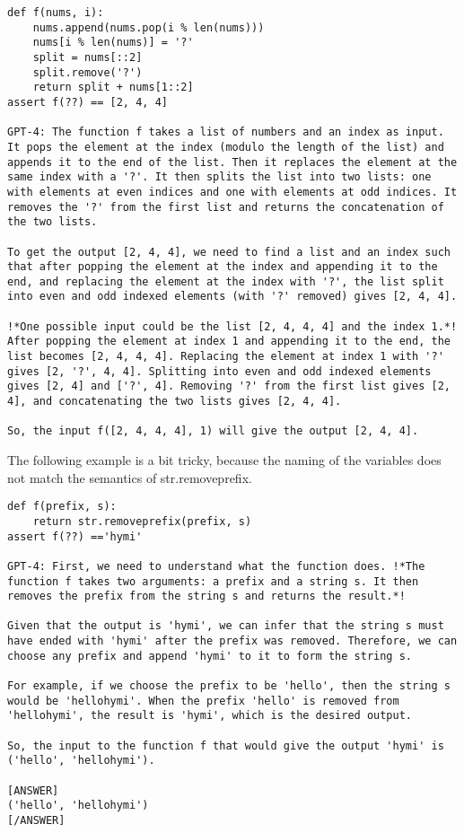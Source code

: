 \begin{lstlisting}
def f(nums, i):
    nums.append(nums.pop(i % len(nums)))
    nums[i % len(nums)] = '?'
    split = nums[::2]
    split.remove('?')
    return split + nums[1::2]
assert f(??) == [2, 4, 4]

GPT-4: The function f takes a list of numbers and an index as input. It pops the element at the index (modulo the length of the list) and appends it to the end of the list. Then it replaces the element at the same index with a '?'. It then splits the list into two lists: one with elements at even indices and one with elements at odd indices. It removes the '?' from the first list and returns the concatenation of the two lists.

To get the output [2, 4, 4], we need to find a list and an index such that after popping the element at the index and appending it to the end, and replacing the element at the index with '?', the list split into even and odd indexed elements (with '?' removed) gives [2, 4, 4].

!*One possible input could be the list [2, 4, 4, 4] and the index 1.*! After popping the element at index 1 and appending it to the end, the list becomes [2, 4, 4, 4]. Replacing the element at index 1 with '?' gives [2, '?', 4, 4]. Splitting into even and odd indexed elements gives [2, 4] and ['?', 4]. Removing '?' from the first list gives [2, 4], and concatenating the two lists gives [2, 4, 4].

So, the input f([2, 4, 4, 4], 1) will give the output [2, 4, 4].
\end{lstlisting}

The following example is a bit tricky, because the naming of the variables does not match the semantics of str.removeprefix. 
\begin{lstlisting}
def f(prefix, s):
    return str.removeprefix(prefix, s)
assert f(??) =='hymi'

GPT-4: First, we need to understand what the function does. !*The function f takes two arguments: a prefix and a string s. It then removes the prefix from the string s and returns the result.*!

Given that the output is 'hymi', we can infer that the string s must have ended with 'hymi' after the prefix was removed. Therefore, we can choose any prefix and append 'hymi' to it to form the string s.

For example, if we choose the prefix to be 'hello', then the string s would be 'hellohymi'. When the prefix 'hello' is removed from 'hellohymi', the result is 'hymi', which is the desired output.

So, the input to the function f that would give the output 'hymi' is ('hello', 'hellohymi').

[ANSWER]
('hello', 'hellohymi')
[/ANSWER]
\end{lstlisting}

